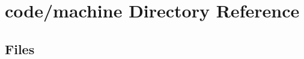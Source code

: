 \section{code/machine Directory Reference}
\label{dir_c6faf5bb1a362c64e2b4a502a2d69864}
\subsection*{Files}
\begin{DoxyCompactItemize}
\end{DoxyCompactItemize}
